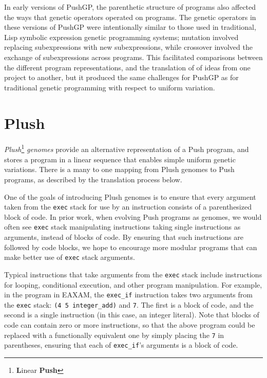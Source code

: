 \documentclass[graybox]{svmult}
\begin{document}
In early versions of PushGP, the parenthetic structure of programs also affected the ways that  genetic
operators operated on programs. The genetic operators in these versions of PushGP were intentionally similar to those used in traditional, Lisp symbolic expression genetic programming systems; mutation involved replacing subexpressions with new subexpressions, while crossover involved the exchange of subexpressions across programs. This facilitated comparisons between the different program representations, and the translation of of ideas from one project to another, but it produced the same challenges for PushGP as for traditional genetic programming with respect to uniform variation.


\section{Plush}
\textit{Plush}\footnote{\textbf{L}inear \textbf{Push}} \textit{genomes} provide
an alternative representation of a Push program, and stores a program in a linear sequence that enables simple uniform genetic variations. There is a many to one mapping from Plush genomes to Push programs, as described by the translation process below.

One of the goals of introducing Plush genomes is to ensure that every argument taken from the \texttt{exec} stack for use by an instruction consists of a parenthesized block of code.
In prior work, when evolving Push programs as genomes, we would often see \texttt{exec} stack manipulating instructions taking single instructions as arguments, instead of blocks of code. By ensuring that such instructions are followed by code blocks, we hope to encourage more modular programs that can make better use of \texttt{exec} stack arguments.

 Typical instructions that take arguments from the \texttt{exec} stack include instructions for looping, conditional execution, and other program manipulation. For example, in the program in EAXAM, the \texttt{exec\_if} instruction takes two arguments from the \texttt{exec} stack: \texttt{(4 5 integer\_add)} and \texttt{7}. The first is a block of code, and the second is a single instruction (in this case, an integer literal).
Note that blocks of code can contain zero or more instructions, so that the above program could be replaced with a functionally equivalent one by simply placing the \texttt{7} in parentheses, ensuring that each of \texttt{exec\_if}'s arguments is a block of code.
\end{document}

